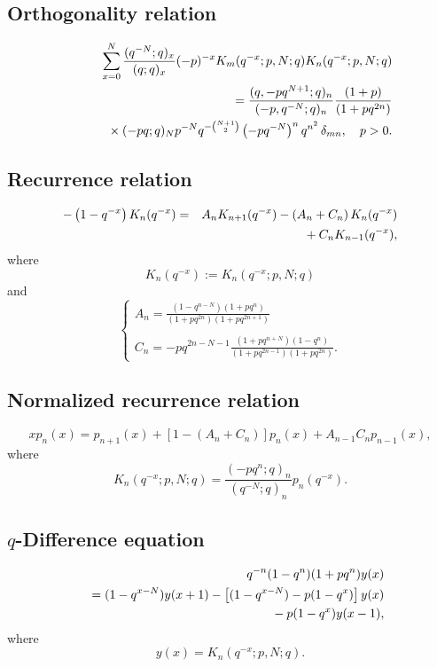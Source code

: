 \documentclass[envcountchap,graybox]{svmono}
\newcommand{\mathindent}{\hspace{7.5mm}}
\begin{document}
\subsection*{Orthogonality relation}
\begin{eqnarray}
\label{OrtqKrawtchouk}
& &\sum_{x=0}^N\frac{(q^{-N};q)_x}{(q;q)_x}(-p)^{-x}K_m(q^{-x};p,N;q)K_n(q^{-x};p,N;q)\nonumber\\
& &{}=\frac{(q,-pq^{N+1};q)_n}{(-p,q^{-N};q)_n}\frac{(1+p)}{(1+pq^{2n})}\nonumber\\
& &{}\mathindent{}\times (-pq;q)_Np^{-N}q^{-\binom{N+1}{2}}
\left(-pq^{-N}\right)^nq^{n^2}\,\delta_{mn},\quad p>0.
\end{eqnarray}

\subsection*{Recurrence relation}
\begin{eqnarray}
\label{RecqKrawtchouk}
-\left(1-q^{-x}\right)K_n(q^{-x})&=&A_nK_{n+1}(q^{-x})-\left(A_n+C_n\right)K_n(q^{-x})\nonumber\\
& &{}\mathindent{}+C_nK_{n-1}(q^{-x}),
\end{eqnarray}
where
$$K_n(q^{-x}):=K_n(q^{-x};p,N;q)$$
and
$$\left\{\begin{array}{l}
\displaystyle A_n=\frac{(1-q^{n-N})(1+pq^n)}{(1+pq^{2n})(1+pq^{2n+1})}\\
\\
\displaystyle C_n=-pq^{2n-N-1}\frac{(1+pq^{n+N})(1-q^n)}{(1+pq^{2n-1})(1+pq^{2n})}.
\end{array}\right.$$

\subsection*{Normalized recurrence relation}
\begin{equation}
\label{NormRecqKrawtchouk}
xp_n(x)=p_{n+1}(x)+\left[1-(A_n+C_n)\right]p_n(x)+A_{n-1}C_np_{n-1}(x),
\end{equation}
where
$$K_n(q^{-x};p,N;q)=\frac{(-pq^n;q)_n}{(q^{-N};q)_n}p_n(q^{-x}).$$

\subsection*{$q$-Difference equation}
\begin{eqnarray}
\label{dvqKrawtchouk}
& &q^{-n}(1-q^n)(1+pq^n)y(x)\nonumber\\
& &{}=(1-q^{x-N})y(x+1)-\left[(1-q^{x-N})-p(1-q^x)\right]y(x)\nonumber\\
& &{}\mathindent{}-p(1-q^x)y(x-1),
\end{eqnarray}
where
$$y(x)=K_n(q^{-x};p,N;q).$$
\end{document}
